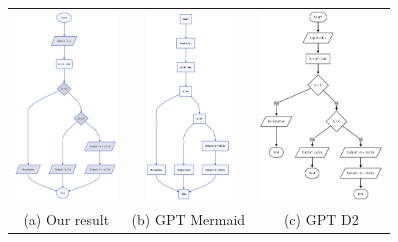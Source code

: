 \documentclass[conference]{IEEEtran}
\begin{document}
\begin{figure}[h!]
	\centering
	\vspace{0.5em}
	
	\begin{tabular}{ccc}
		\includegraphics[height=5cm]{ex6.png} &
		\includegraphics[height=5cm]{chat1.png} &
		\includegraphics[height=5cm]{chat2.png} \\
		(a) Our result & (b) GPT Mermaid & (c) GPT D2 \\
	\end{tabular}
	
	\vspace{1em}
	

\end{figure}
\end{document}
